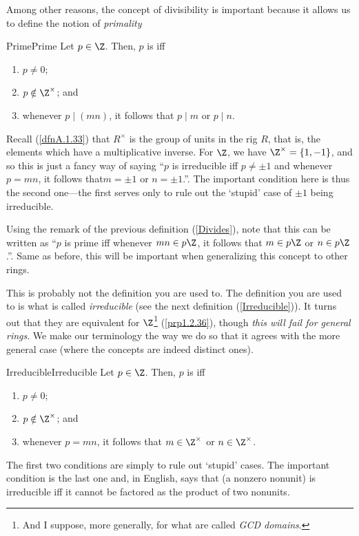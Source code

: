 Among other reasons, the concept of divisibility is important because it allows us to define the notion of \emph{primality}
\begin{dfn}{Prime}{Prime}
Let $p\in \Z$.  Then, $p$ is  iff
\begin{enumerate}
\item \label{Prime.i}$p\neq 0$;
\item \label{Prime.ii}$p\notin \Z ^{\times}$; and
\item \label{Prime.iii}whenever $p\mid (mn)$, it follows that $p\mid m$ or $p\mid n$.
\end{enumerate}
\begin{rmk}
Recall (\cref{dfnA.1.33}) that $R^{\times}$ is the group of units in the rig $R$, that is, the elements which have a multiplicative inverse.  For $\Z$, we have $\Z ^{\times}=\{ 1,-1\}$, and so this is just a fancy way of saying ``$p$ is irreducible iff $p\neq \pm 1$ and whenever $p=mn$, it follows that$m=\pm 1$ or $n=\pm 1$.''.  The important condition here is thus the second one---the first serves only to rule out the `stupid' case of $\pm 1$ being irreducible.
\end{rmk}
\begin{rmk}
Using the remark of the previous definition (\cref{Divides}), note that this can be written as ``$p$ is prime iff whenever $mn\in p\Z$, it follows that $m\in p\Z$ or $n\in p\Z$.''.  Same as before, this will be important when generalizing this concept to other rings.
\end{rmk}
\begin{rmk}
This is probably not the definition you are used to.  The definition you are used to is what is called \emph{irreducible} (see the next definition (\cref{Irreducible})).  It turns out that they are equivalent for $\Z$\footnote{And I suppose, more generally, for what are called \emph{GCD domains}.} (\cref{prp1.2.36}), though \emph{this will fail for general rings}.  We make our terminology the way we do so that it agrees with the more general case (where the concepts are indeed distinct ones).
\end{rmk}
\end{dfn}
\begin{dfn}{Irreducible}{Irreducible}
Let $p\in \Z$.  Then, $p$ is  iff
\begin{enumerate}
\item \label{Irreducible.ix}$p\neq 0$;
\item \label{Irreducible.i}$p\notin \Z ^{\times}$; and
\item \label{Irreducible.ii}whenever $p=mn$, it follows that $m\in \Z ^{\times}$ or $n\in \Z ^{\times}$.
\end{enumerate}
\begin{rmk}
The first two conditions are simply to rule out `stupid' cases.  The important condition is the last one and, in English, says that (a nonzero nonunit) is irreducible iff it cannot be factored as the product of two nonunits.
\end{rmk}
\end{dfn}
